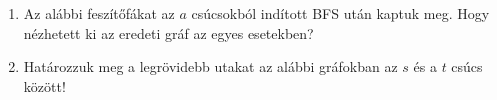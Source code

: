 \documentclass[a4paper,12pt]{article}
\begin{document}
    \noindent{}
    \noindent{}
    \begin{enumerate}
        \item Az alábbi feszítőfákat az $a$ csúcsokból indított BFS után kaptuk meg. Hogy nézhetett ki az eredeti gráf az egyes esetekben? 
        \begin{figure}[!h]
            \centering
            \begin{subfigure}{0.2\textwidth}
                \centering
                
            \end{subfigure}
            \begin{subfigure}{0.2\textwidth}
                \centering		
                
            \end{subfigure}
            \begin{subfigure}{0.2\textwidth}
                \centering
                
            \end{subfigure}
            \begin{subfigure}{0.2\textwidth}
                \centering
                
            \end{subfigure}
        \end{figure}

        \item Határozzuk meg a legrövidebb utakat az alábbi gráfokban az $s$ és a $t$ csúcs között!
        \begin{figure}[!h]
            \centering \hfill
            \hfill
            \hfill \hfill
        \end{figure}
        

\end{enumerate}
\end{document}
